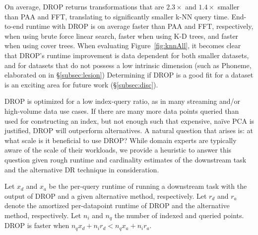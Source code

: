 On average, DROP returns transformations that are $2.3\times$ and  $1.4\times$ smaller than PAA and FFT, translating to significantly smaller k-NN query time. 
End-to-end runtime with DROP is on average  faster than PAA and FFT, respectively, when using brute force linear search,    faster when using K-D trees, and  faster when using cover trees.
When evaluating Figure~\ref{fig:knnAll}, it becomes clear that DROP's runtime improvement is data dependent for both smaller datasets, and for datasets that do not possess a low intrinsic dimension (such as Phoneme, elaborated on in \S\ref{subsec:lesion})
Determining if DROP is a good fit for a dataset is an exciting area for future work (\S\ref{subsec:disc}).



 DROP is optimized for a low index-query ratio, as in many streaming and/or high-volume data use cases.
If there are many more data points queried than used for constructing an index, but not enough such that expensive, na\"ive PCA is justified, DROP will outperform alternatives. 
A natural question that arises is: at what scale is it beneficial to use DROP?
While domain experts are typically aware of the scale of their workloads, we provide a heuristic to answer this question given rough runtime and cardinality estimates of the downstream task and the alternative DR technique in consideration.

Let $x_d$ and $x_a$ be the per-query runtime of running a downstream task with the output of DROP and a given alternative method, respectively. 
Let $r_d$ and $r_a$ denote the amortized per-datapoint runtime of DROP and the alternative method, respectively. 
Let $n_i$ and $n_q$ the number of indexed and queried points. 
DROP is faster when $n_q x_d + n_i r_d < n_q x_a + n_i r_a$.

